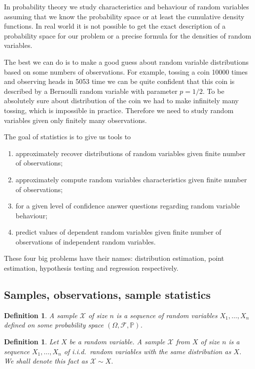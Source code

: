 \documentclass[12pt]{article}
\newtheorem{definition}[theorem]{Definition}
\begin{document}
In probability theory we study characteristics and behaviour of random variables
assuming that we know the probability space or at least the cumulative density
functions. In real world it is not possible to get the exact description of a
probability space for our problem or a precise formula for the densities of
random variables.

The best we can do is to make a good guess about random variable distributions
based on some numbers of observations. For example, tossing a coin 10000 times
and observing heads in 5053 time we can be quite confident that this coin is
described by a Bernoulli random variable with parameter $p=1/2$. To be
absolutely sure about distribution of the coin we had to make infinitely many
tossing, which is impossible in practice. Therefore we need to study random
variables given only finitely many observations.

The goal of statistics is to give us tools to
\begin{enumerate}
    \item approximately recover distributions of random variables given finite
          number of observations;
    \item approximately compute random variables characteristics given finite
          number of observations;
    \item for a given level of confidence answer questions regarding random
          variable behaviour;
    \item predict values of dependent random variables given finite number of
          observations of independent random variables.
\end{enumerate}
These four big problems have their names: distribution estimation, point
estimation, hypothesis testing and regression respectively.

\subsection{Samples, observations, sample statistics}

\begin{definition} A sample $\mathscr{X}$ of size $n$ is a sequence of random
    variables $X_1,\ldots,X_n$ defined on some probability 
    space $(\Omega,\mathcal{F},\mathbb{P})$.
\end{definition}

\begin{definition} Let $X$ be a random variable. A sample $\mathscr{X}$ from $X$
    of size $n$ is a sequence $X_1,\ldots,X_n$ of i.i.d.\ random variables with
    the same distribution as $X$. We shall denote this fact as $\mathscr{X}\sim
        X$.
\end{definition}
\end{document}
